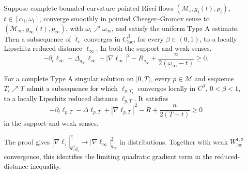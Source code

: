 \begin{theorem}
\label{thm:chow-iv-singular-time-reduced-distance-limit}
Suppose complete bounded-curvature pointed Ricci flows
\((\mathcal M_i,g_i(t),p_i)\), \(t\in[\alpha_i,\omega_i]\), converge smoothly
in pointed Cheeger--Gromov sense to
\((\mathcal M_\infty,g_\infty(t),p_\infty)\), with
\(\omega_i\nearrow\omega_\infty\), and satisfy the uniform Type A estimate.
Then a subsequence of \(\widetilde\ell_i\) converges in
\(C^\beta_{\mathrm{loc}}\), for every \(\beta\in(0,1)\), to a locally
Lipschitz reduced distance \(\ell_\infty\).  In both the support and weak
senses,
\[
 -\partial_t\ell_\infty-\Delta_{g_\infty}\ell_\infty
 +|\nabla\ell_\infty|^2-R_{g_\infty}
 +\frac{n}{2(\omega_\infty-t)}\geq0.
\]
\end{theorem}

\begin{corollary}
\label{cor:chow-iv-type-a-singular-time-reduced-distance}
For a complete Type A singular solution on \([0,T)\), every \(p\in\mathcal M\)
and sequence \(T_i\nearrow T\) admit a subsequence for which
\(\ell_{p,T_i}\) converges locally in \(C^\beta\), \(0<\beta<1\), to a
locally Lipschitz reduced distance \(\ell_{p,T}\).  It satisfies
\[
 -\partial_t\ell_{p,T}-\Delta\ell_{p,T}+|\nabla\ell_{p,T}|^2-R
 +\frac{n}{2(T-t)}\geq0
\]
in the support and weak senses.
\end{corollary}

\begin{remark}
\label{rem:chow-iv-strong-reduced-distance-gradient-convergence}
The proof gives
\(|\nabla\widetilde\ell_i|^2_{\Phi_i^*g_i}
\to|\nabla\ell_\infty|^2_{g_\infty}\) in distributions.  Together with
weak \(W^{1,2}_{\mathrm{loc}}\) convergence, this identifies the limiting
quadratic gradient term in the reduced-distance inequality.
\end{remark}

